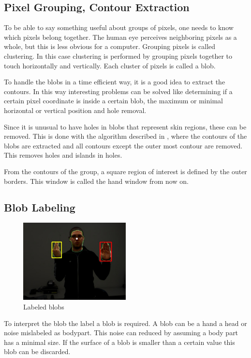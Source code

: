\subsection*{Pixel Grouping, Contour Extraction}
To be able to say something useful about groups of pixels, one needs to know which pixels belong together. The human eye perceives neighboring pixels as a whole, but this is less obvious for a computer. Grouping pixels is called clustering. In this case clustering is performed by grouping pixels together to touch horizontally and vertically. Each cluster of pixels is called a blob.

To handle the blobs in a time efficient way, it is a good idea to extract the contours. In this way interesting problems can be solved like determining if a certain pixel coordinate is inside a certain blob, the maximum or minimal horizontal or vertical position and hole removal.

Since it is unusual to have holes in blobs that represent skin regions, these can be removed. This is done with the algorithm described in \cite{Suzuki1985}, where the contours of the blobs are extracted and all contours except the outer most contour are removed. This removes holes and islands in holes.

From the contours of the group, a square region of interest is defined by the outer borders. This window is called the hand window from now on.

\subsection*{Blob Labeling}

\begin{figure}[htbp]
    \center{}
    \includegraphics[width=0.5\textwidth]{figures/pipeline/contours.jpg}
	\caption{Labeled blobs}
	\label{fig:contours}
\end{figure}

To interpret the blob the label a blob is required. A blob can be a hand a head or noise mislabeled as bodypart. This noise can reduced by assuming a body part has a minimal size. If the surface of a blob is smaller than a certain value this blob can be discarded.

